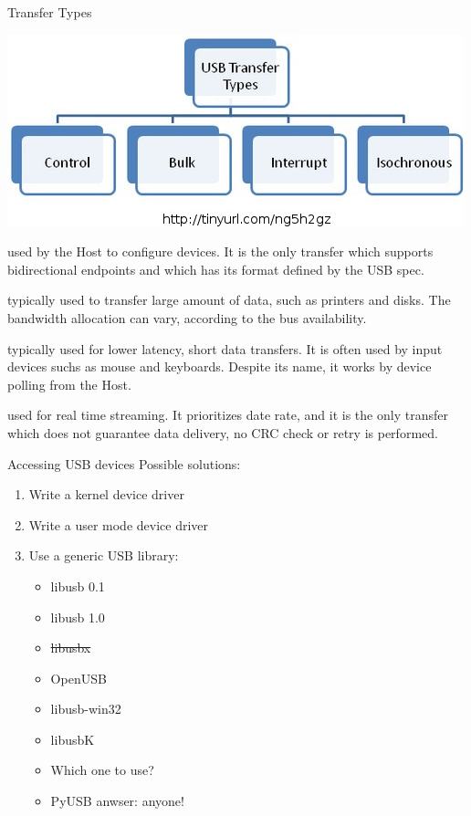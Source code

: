 \documentclass[pdf]{beamer}
\begin{document}
\begin{frame}{Transfer Types}
  \begin{center}
    \includegraphics[scale=0.35]{img/transfer_types.jpg}
  \end{center}
  \begin{description}
    \tiny
    \item[Control] used by the Host to configure devices. It is the only transfer
      which supports bidirectional endpoints and which has its format defined by
      the USB spec.
    \item[Bulk] typically used to transfer large amount of data, such as
      printers and disks. The bandwidth allocation can vary, according to the
      bus availability.
    \item[Interrupt] typically used for lower latency, short data transfers. It
      is often used by input devices suchs as mouse and keyboards. Despite its
      name, it works by device polling from the Host.
    \item[Isochronous] used for real time streaming. It prioritizes date rate,
      and it is the only transfer which does not guarantee data delivery, no
      CRC check or retry is performed.
  \end{description}
\end{frame}

\begin{frame}{Accessing USB devices}
  \pause
  Possible solutions:
  \begin{enumerate}
    \pause
    \item Write a kernel device driver
    \pause
    \item Write a user mode device driver
    \pause
    \item Use a generic USB library:
      \pause
      \begin{itemize}
          \item libusb 0.1
          \item libusb 1.0
          \item \sout{libusbx}
          \item OpenUSB
          \item libusb-win32
          \item libusbK
      \end{itemize}
      \begin{itemize}
        \pause
        \item Which one to use?
        \pause
        \item PyUSB anwser: anyone!
      \end{itemize}
  \end{enumerate}
\end{frame}
\end{document}
